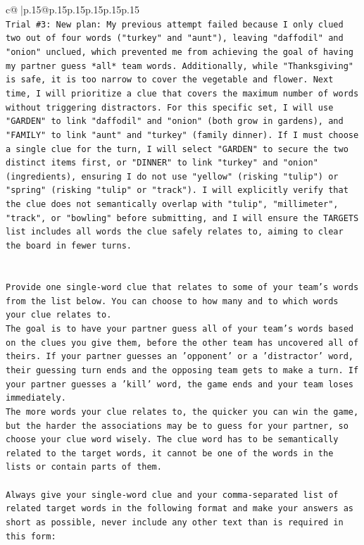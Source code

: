 \documentclass{article}
\begin{document}
{\begin{supertabular}{c@{$\;$}|p{.15\linewidth}@{}p{.15\linewidth}p{.15\linewidth}p{.15\linewidth}p{.15\linewidth}p{.15\linewidth}}
{{{\\ 
\texttt{Trial \#3: New plan: My previous attempt failed because I only clued two out of four words ("turkey" and "aunt"), leaving "daffodil" and "onion" unclued, which prevented me from achieving the goal of having my partner guess *all* team words. Additionally, while "Thanksgiving" is safe, it is too narrow to cover the vegetable and flower. Next time, I will prioritize a clue that covers the maximum number of words without triggering distractors. For this specific set, I will use "GARDEN" to link "daffodil" and "onion" (both grow in gardens), and "FAMILY" to link "aunt" and "turkey" (family dinner). If I must choose a single clue for the turn, I will select "GARDEN" to secure the two distinct items first, or "DINNER" to link "turkey" and "onion" (ingredients), ensuring I do not use "yellow" (risking "tulip") or "spring" (risking "tulip" or "track"). I will explicitly verify that the clue does not semantically overlap with "tulip", "millimeter", "track", or "bowling" before submitting, and I will ensure the TARGETS list includes all words the clue safely relates to, aiming to clear the board in fewer turns.} \\
\\ 
\\ 
\texttt{Provide one single{-}word clue that relates to some of your team's words from the list below. You can choose to how many and to which words your clue relates to.} \\
\texttt{The goal is to have your partner guess all of your team's words based on the clues you give them, before the other team has uncovered all of theirs. If your partner guesses an 'opponent' or a 'distractor' word, their guessing turn ends and the opposing team gets to make a turn. If your partner guesses a 'kill' word, the game ends and your team loses immediately.} \\
\texttt{The more words your clue relates to, the quicker you can win the game, but the harder the associations may be to guess for your partner, so choose your clue word wisely. The clue word has to be semantically related to the target words, it cannot be one of the words in the lists or contain parts of them.} \\
\\ 
\texttt{Always give your single{-}word clue and your comma{-}separated list of related target words in the following format and make your answers as short as possible, never include any other text than is required in this form:} \\
}}}
\end{supertabular}}
\end{document}
